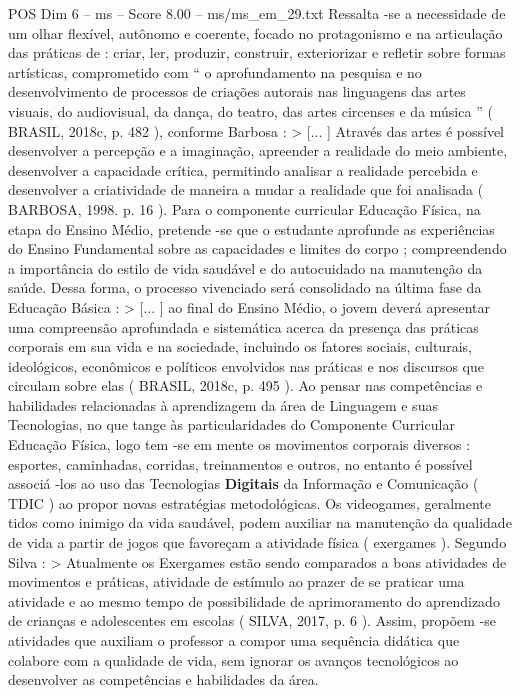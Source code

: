 \begin{textsample}{POS Dim 6 – ms – Score 8.00 – ms/ms\_em\_29.txt}
Ressalta -se a necessidade de um olhar flexível, autônomo e coerente, focado no protagonismo e na articulação das práticas de : criar, ler, produzir, construir, exteriorizar e refletir sobre formas artísticas, comprometido com “ o aprofundamento na pesquisa e no desenvolvimento de processos de criações autorais nas linguagens das artes visuais, do audiovisual, da dança, do teatro, das artes circenses e da música ” ( BRASIL, 2018c, p. 482 ), conforme Barbosa : > [... ] Através das artes é possível desenvolver a percepção e a imaginação, apreender a realidade do meio ambiente, desenvolver a capacidade crítica, permitindo analisar a realidade percebida e desenvolver a criatividade de maneira a mudar a realidade que foi analisada ( BARBOSA, 1998. p. 16 ).
Para o componente curricular Educação Física, na etapa do Ensino Médio, pretende -se que o estudante aprofunde as experiências do Ensino Fundamental sobre as capacidades e limites do corpo ; compreendendo a importância do estilo de vida saudável e do autocuidado na manutenção da saúde.
Dessa forma, o processo vivenciado será consolidado na última fase da Educação Básica : > [... ] ao final do Ensino Médio, o jovem deverá apresentar uma compreensão aprofundada e sistemática acerca da presença das práticas corporais em sua vida e na sociedade, incluindo os fatores sociais, culturais, ideológicos, econômicos e políticos envolvidos nas práticas e nos discursos que circulam sobre elas ( BRASIL, 2018c, p. 495 ).
Ao pensar nas competências e habilidades relacionadas à aprendizagem da área de Linguagem e suas Tecnologias, no que tange às particularidades do Componente Curricular Educação Física, logo tem -se em mente os movimentos corporais diversos : esportes, caminhadas, corridas, treinamentos e outros, no entanto é possível associá -los ao uso das Tecnologias \textbf{Digitais} da Informação e Comunicação ( TDIC ) ao propor novas estratégias metodológicas.
Os videogames, geralmente tidos como inimigo da vida saudável, podem auxiliar na manutenção da qualidade de vida a partir de jogos que favoreçam a atividade física ( exergames ).
Segundo Silva : > Atualmente os Exergames estão sendo comparados a boas atividades de movimentos e práticas, atividade de estímulo ao prazer de se praticar uma atividade e ao mesmo tempo de possibilidade de aprimoramento do aprendizado de crianças e adolescentes em escolas ( SILVA, 2017, p. 6 ).
Assim, propõem -se atividades que auxiliam o professor a compor uma sequência didática que colabore com a qualidade de vida, sem ignorar os avanços tecnológicos ao desenvolver as competências e habilidades da área.

\end{textsample}
